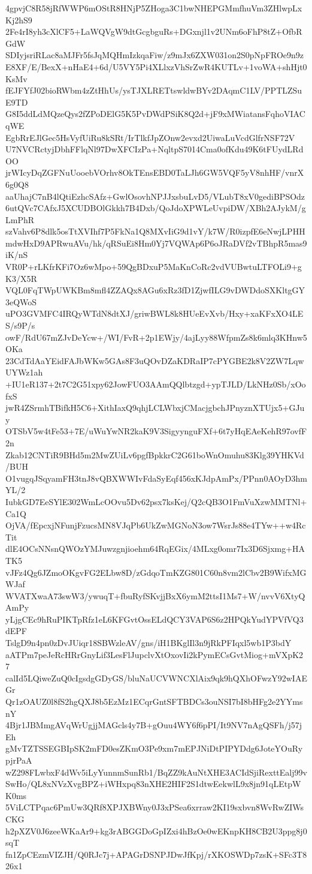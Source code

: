 4gpvjC8R58jRfWWP6mOStR8HNjP5ZHoga3C1bwNHEPGMmfhuVm3ZHlwpLxKj2hS9
2Fe4rI8yh3cXlCF5+LaWQVgW9dtGcgbguRs+DGxnjl1v2UNm6oFhP8tZ+OfbRGdW
SDIyjsriRLac8aMJFr5fsJqMQHmIzkqaFiw/z9mJx6ZXW031on2S0pNpFROe9n9z
E8XF/E/BexX+nHaE4+6d/U5VY5Pi4XLlxzVhSrZwR4KUTLv+1voWA+shHjt0KsMv
fEJFYfJ02bioRWbm4zZtHhUs/ysTJXLRETtswldwBYv2DAqmC1LV/PPTLZSuE9TD
G8I5ddLdMQzeQys2fZPoDElG5K5PvDWdPSiK8Q2d+jF9xMWiatansFqhoVIACqWE
EgbRrEJlGec5HsVyfUiRu8kSRt/IrTlkfJpZOnw2evxd2UiwaLuVcdGlfrNSF72V
U7NVCRctyjDbhFFlqNl97DwXFCIzPa+NqltpS7014Cma0ofKdu49K6tFUydLRdOO
jrWIcyDqZGFNuUooebVOrhv8OkTEnsEBD0TaLJh6GW5VQF5yV8nhHF/vnrX6g0Q8
aaUhajC7nB4lQtiEzhcSAfz+GwlOsovhNPJJxsbuLvD5/VLubT8xV0gediBPSOdz
6utQVc7CAfxJ5XCUDBOlGkkh7B4Dxb/QoJdoXPWLeUvpiDW/XBh2AJykM/gLmPhR
szVahv6P8dlk5osTtXVIhf7P5FkNa1Q8MXvIiG9d1vY/k7W/R0izpfE6eNwjLPHH
mdwHxD9APRwuAVu/hk/qRSuEi8Hm0Yj7VQWAp6P6oJRaDVf2vTBhpR5mas9iK/nS
VR0P+rLKfrKFi7Oz6wMpo+59QgBDxuP5MaKnCoRc2vdVUBwtuLTFOLi9+gK3/X5R
VQL0FqTWpUWKBm8mfl4ZZAQx8AGu6xRz3fD1ZjwfILG9vDWDdoSXKltgGY3eQWoS
uPO3GVMFC4IRQyWTdN8dtXJ/griwBWL8k8HUeEvXvb/Hxy+xaKFxXO4LES/s9P/s
owF/RdU67mZJvDeYcw+/WI/FvR+2p1EWjy/4ajLyy88WfpmZs8k6mlq3KHnw5OKa
23CdTdAaYEidFAJbWKw5GAs8F3uQOvDZaKDRaIP7cPYGBE2k8V2ZW7LqwUYWz1ah
+IU1eR137+2t7C2G51xpy62JowFUO3AAmQQlbtzgd+ypTJLD/LkNHz0Sb/xOofxS
jwR4ZSrmhTBifkH5C6+XithIaxQ9qhjLCLWbxjCMacjgbchJPnyznXTUjx5+GJuy
OTSbV5w4tFe53+7E/uWuYwNR2kaK9V3SigyynguFXf+6t7yHqEAeKehR97ovfF2n
Zkab12CNTiR9BHd5m2MwZUiLv6pgfBpkkrC2G61boWnOmuhu83Klg39YHKVd/BUH
O1vugqJSqyamFH3tnJ8vQBXWWIvFdaSyEqf456xKJdpAmPx/PPnn0AOyD3hmYL/2
IubkGD7EeSYlE302WmLcOOvu5Dv62psx7ksKej/Q2cQB3O1FmVuXzwMMTNl+Ca1Q
OjVA/fEpcxjNFunjFzucsMN8VJqPb6UkZwMGNoN3ow7WsrJs88e4TYw++w4RcTit
dlE4OCsNNsnQWOzYMJuwzgnjioehm64RqEGix/4MLxg0omr7Ix3D6Sjxmg+HATK5
vJFz4Qg6JZmoOKgvFG2ELbw8D/zGdqoTmKZG801C60n8vm2lCbv2B9WifxMGWJaf
WVATXwaA73swW3/ywuqT+fbuRyfSKvjjBxX6ymM2ttsI1Ms7+W/nvvV6XtyQAmPy
yLjgCEc9hRuPIKTpRfz1eL6KFGvtOssELdQCY3VAP6S6z2HPQkYudYPVfVQ3dEPF
TslgD9n4pn0zDvJUiqr18SBWzleAV/gns/iH1BKglIl3n9jRkPFIqxl5wb1P3bdY
aATPm7peJeRcHRrGnyLif3LesFlJupclvXtOxovIi2kPymECsGvtMiog+mVXpK27
calId5LQiweZuQ0cIgsdgGDyGS/bluNaUCVWNCXlAix9qk9hQXhOFwzY92wIAEGr
Qr1zOAUZ0l8fS2hgQXJ8b5EzMz1ECqrGntSFTBDCs3ouNSI7bI8bHFg2e2YYmsnY
4Bjr1JBMmgAVqWrUgjjMAGcls4y7B+gOuu4WY6f6pPI/It9NV7nAgQSFh/j57jEh
gMvTZTSSEGBIpSK2mFD0esZKmO3Pe9xm7mEPJNiDtPIPYDdg6JoteYOuRypjrPaA
wZ298FLwbxF4dWv5iLyYunnmSunRb1/BqZZ9kAuNtXHE3ACIdSjiRexttEalj99v
SwHo/QL8xNVzXvgBPZ+iWHxpq83nXHE2HIF2S1dtwEekwlL9x8jn91qLEtpWK0ms
5ViLCTPqac6PmUw3QRf8XPJXBWny0J3xPSea6xrraw2KI19sxbvn8WvRwZIWsCKG
h2pXZV0J6zeeWKaAr9+kg3rABGGDoGpIZxi4hBzOe0wEKnpKH8CB2U3ppg8j0sqT
fn1ZpCEzmVIZJH/Q0RJc7j+APAGrDSNPJDwJfKpj/rXKOSWDp7zsK+SFc3T826x1
